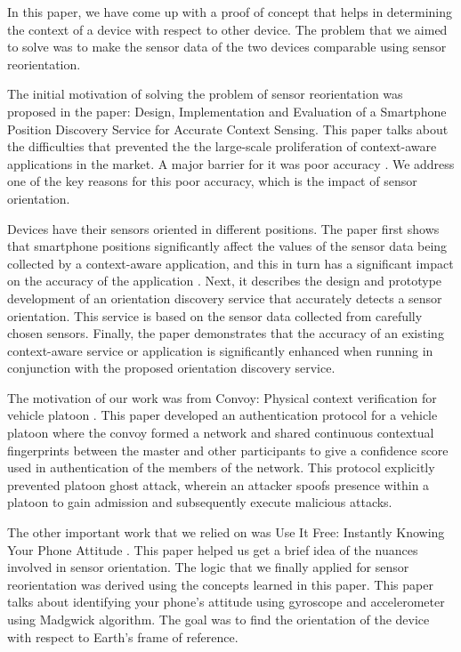 \documentclass[journal]{IEEEtranTIE}
\begin{document}
In this paper, we have come up with a proof of concept that helps in determining 
the context of a device with respect to other device. The problem that we aimed 
to solve was to make the sensor data of the two devices comparable using sensor 
reorientation.

The initial motivation of solving the problem of sensor reorientation was proposed 
in the paper: Design, Implementation and Evaluation of a Smartphone Position Discovery 
Service for Accurate Context Sensing. This paper talks about the difficulties that 
prevented the the large-scale proliferation of context-aware applications in the market. 
A major barrier for it was poor accuracy \cite{Alanezi}.
We address one of the key reasons for this poor accuracy, which is the impact of
sensor orientation.

Devices have their sensors oriented in different positions. The paper first shows that
smartphone positions significantly affect the values of the
sensor data being collected by a context-aware application, and this in turn
has a significant impact on the accuracy of the application \cite{Alanezi}.
Next, it describes the design and prototype development of an orientation
discovery service that accurately detects a sensor orientation. This service is
based on the sensor data collected from carefully chosen sensors. Finally, the
paper demonstrates that the accuracy of an existing context-aware service or
application is significantly enhanced when running in conjunction with the proposed
orientation discovery service. 

The motivation of our work was from Convoy: Physical context verification for vehicle platoon 
\cite{Han}. This paper developed an authentication protocol for a vehicle platoon where the 
convoy formed a network and shared continuous contextual fingerprints between the master and 
other participants to give a confidence score used in authentication of the members of the 
network. This protocol explicitly prevented platoon ghost attack, wherein an attacker spoofs 
presence within a platoon to gain admission and subsequently execute malicious attacks. 

The other important work that we relied on was Use It Free: Instantly Knowing Your Phone Attitude 
\cite{PhoneAttitude}. This paper helped us get a brief idea of the nuances involved in sensor 
orientation. The logic that we finally applied for sensor reorientation was derived using the 
concepts learned in this paper. This paper talks about identifying your phone's attitude using
gyroscope and accelerometer using Madgwick algorithm. The goal was to find the orientation of 
the device with respect to Earth's frame of reference. 
\end{document}
